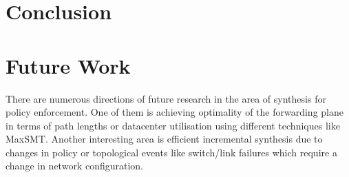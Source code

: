 \section{Conclusion}


\section{Future Work}
There are numerous directions of future research in the area of synthesis for policy enforcement. 
One of them is achieving optimality of the forwarding plane
 in terms of path lengths or datacenter utilisation using different techniques like MaxSMT. Another interesting area
 is efficient incremental synthesis due to changes in policy or topological events like switch/link failures 
 which require a change in network configuration. 

